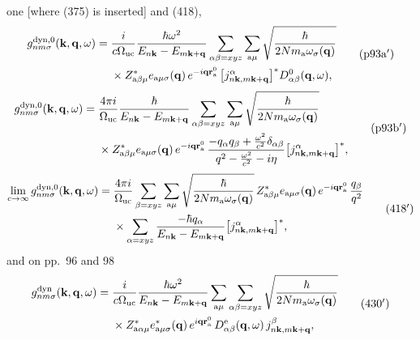 \documentclass[11pt]{article}
\begin{document}
one [where (375) is inserted] and (418),
\begin{equation*}
\begin{split}
g^{\rm dyn,0}_{nm\sigma}(\mathbf k,\mathbf q,\omega)={}&\frac{i}{c\Omega_{\rm uc}}
\frac{\hbar\omega^2}{E_{n\mathbf k}-E_{m\mathbf k+\mathbf q}}\sum_{\alpha\beta=xyz}\sum_{{\rm a}\mu}
\sqrt{\frac{\hbar}{2Nm_{\rm a}\omega_\sigma(\mathbf q)}}\\
&\times Z^*_{{\rm a}\beta\mu}e_{{\rm a}\mu\sigma}(\mathbf q)\,e^{-i\mathbf q\mathbf r^0_{\rm a}}\,
\big[j^\alpha_{n\mathbf k,m\mathbf k+\mathbf q}\big]^*D^0_{\alpha\beta}(\mathbf q,\omega),
\end{split}
\tag{p93a$'$}
\end{equation*}
\begin{equation*}
\begin{split}
g^{\rm dyn,0}_{nm\sigma}(\mathbf k,\mathbf q,\omega)={}&\frac{4\pi i}{\Omega_{\rm uc}}
\frac{\hbar}{E_{n\mathbf k}-E_{m\mathbf k+\mathbf q}}\sum_{\alpha\beta=xyz}\sum_{{\rm a}\mu}
\sqrt{\frac{\hbar}{2Nm_{\rm a}\omega_\sigma(\mathbf q)}}\\
&\times Z^*_{{\rm a}\beta\mu}e_{{\rm a}\mu\sigma}(\mathbf q)\,e^{-i\mathbf q\mathbf r^0_{\rm a}}\,
\frac{-q_\alpha q_\beta+\frac{\omega^2}{c^2}\delta_{\alpha\beta}}{q^2-\frac{\omega^2}{c^2}-i\eta}
\big[j^\alpha_{n\mathbf k,m\mathbf k+\mathbf q}\big]^*,
\end{split}
\tag{p93b$'$}
\end{equation*}
\begin{equation*}
\begin{split}
\lim_{c\to\infty}g^{\rm dyn,0}_{nm\sigma}(\mathbf k,\mathbf q,\omega)={}&\frac{4\pi i}{\Omega_{\rm uc}}
\sum_{\beta=xyz}\sum_{{\rm a}\mu}\sqrt{\frac{\hbar}{2Nm_{\rm a}\omega_\sigma(\mathbf q)}}\,
Z^*_{{\rm a}\beta\mu}e_{{\rm a}\mu\sigma}(\mathbf q)\,e^{-i\mathbf q\mathbf r^0_{\rm a}}\,\frac{q_\beta}{q^2}\\
&\times\sum_{\alpha=xyz}\frac{-\hbar q_\alpha}{E_{n\mathbf k}-E_{m\mathbf k+\mathbf q}}
\big[j^\alpha_{n\mathbf k,m\mathbf k+\mathbf q}\big]^*,
\end{split}
\tag{418$'$}
\end{equation*}
and on pp.~96 and 98
\begin{equation*}
\begin{split}
g^{\rm dyn}_{nm\sigma}(\mathbf k,\mathbf q,\omega)={}&\frac{i}{c\Omega_{\rm uc}}
\frac{\hbar\omega^2}{E_{n\mathbf k}-E_{m\mathbf k+\mathbf q}}\sum_{{\rm a}\mu}\sum_{\alpha\beta=xyz}
\sqrt{\frac{\hbar}{2Nm_{\rm a}\omega_\sigma(\mathbf q)}}\\
&\times Z^*_{{\rm a}\alpha\mu}e^*_{{\rm a}\mu\sigma}(\mathbf q)\,e^{i\mathbf q\mathbf r^0_{\rm a}}\,
D^{\rm e}_{\alpha\beta}(\mathbf q,\omega)\,j^\beta_{n\mathbf k,m\mathbf k+\mathbf q},
\end{split}
\tag{430$'$}
\end{equation*}
\end{document}
